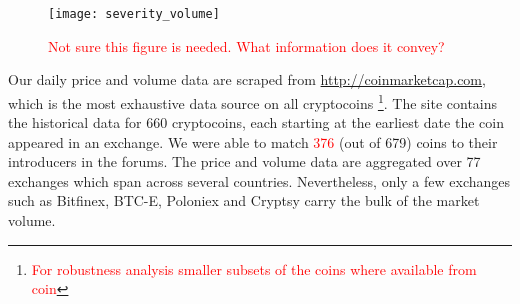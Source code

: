 \begin{figure}
\texttt{[image: severity\_volume]}
\caption{\textcolor{red}{Not sure this figure is needed. What information does it convey?}}
\end{figure}
Our daily price and volume data are scraped from \url{http://coinmarketcap.com}, which is the most exhaustive data source on all cryptocoins \footnote{\textcolor{red}{For robustness analysis smaller subsets of the coins where available from coin}}.
The site contains the historical data for 660 cryptocoins, each starting at the earliest date the coin appeared in an exchange. We were able to match \textcolor{red}{376} (out of 679) coins to their introducers in the forums. The price and volume data are aggregated over 77 exchanges which span across several countries. Nevertheless, only a few exchanges such as Bitfinex, BTC-E, Poloniex and Cryptsy carry the bulk of the market volume.

